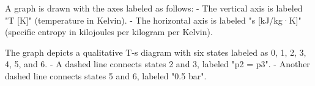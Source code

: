 A graph is drawn with the axes labeled as follows:  
- The vertical axis is labeled "T [K]" (temperature in Kelvin).  
- The horizontal axis is labeled "s [kJ/kg·K]" (specific entropy in kilojoules per kilogram per Kelvin).  

The graph depicts a qualitative T-s diagram with six states labeled as 0, 1, 2, 3, 4, 5, and 6.  
- A dashed line connects states 2 and 3, labeled "p2 = p3".  
- Another dashed line connects states 5 and 6, labeled "0.5 bar".